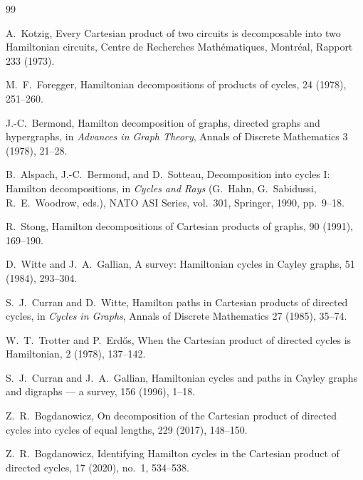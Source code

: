 \documentclass[11pt]{article}
\begin{document}
\begin{thebibliography}{99}

A.~Kotzig,
\newblock Every Cartesian product of two circuits is decomposable into two Hamiltonian circuits,
\newblock Centre de Recherches Math\'ematiques, Montr\'eal, Rapport 233 (1973).

M.~F.~Foregger,
\newblock Hamiltonian decompositions of products of cycles,
 24 (1978), 251--260.

J.-C.~Bermond,
\newblock Hamilton decomposition of graphs, directed graphs and hypergraphs,
\newblock in {\em Advances in Graph Theory}, Annals of Discrete Mathematics 3 (1978), 21--28.

B.~Alspach, J.-C.~Bermond, and D.~Sotteau,
\newblock Decomposition into cycles I: Hamilton decompositions,
\newblock in {\em Cycles and Rays} (G.~Hahn, G.~Sabidussi, R.~E.~Woodrow, eds.),
NATO ASI Series, vol.~301, Springer, 1990, pp.~9--18.

R.~Stong,
\newblock Hamilton decompositions of Cartesian products of graphs,
 90 (1991), 169--190.

D.~Witte and J.~A.~Gallian,
\newblock A survey: Hamiltonian cycles in Cayley graphs,
 51 (1984), 293--304.

S.~J.~Curran and D.~Witte,
\newblock Hamilton paths in Cartesian products of directed cycles,
\newblock in {\em Cycles in Graphs}, Annals of Discrete Mathematics 27 (1985), 35--74.

W.~T.~Trotter and P.~Erd\H{o}s,
\newblock When the Cartesian product of directed cycles is Hamiltonian,
 2 (1978), 137--142.

S.~J.~Curran and J.~A.~Gallian,
\newblock Hamiltonian cycles and paths in Cayley graphs and digraphs --- a survey,
 156 (1996), 1--18.

Z.~R.~Bogdanowicz,
\newblock On decomposition of the Cartesian product of directed cycles into cycles of equal lengths,
 229 (2017), 148--150.

Z.~R.~Bogdanowicz,
\newblock Identifying Hamilton cycles in the Cartesian product of directed cycles,
 17 (2020), no.~1, 534--538.


\end{thebibliography}
\end{document}
